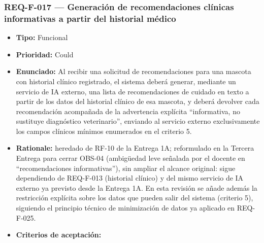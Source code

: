 \documentclass[
  spanish,
]{article}
\providecommand{\tightlist}{%
  \setlength{\itemsep}{0pt}\setlength{\parskip}{0pt}}
\begin{document}
\subsubsection{REQ-F-017 --- Generación de recomendaciones clínicas
informativas a partir del historial
médico}\label{req-f-017-generaciuxf3n-de-recomendaciones-cluxednicas-informativas-a-partir-del-historial-muxe9dico}

\begin{itemize}
\tightlist
\item
  \textbf{Tipo:} Funcional
\item
  \textbf{Prioridad:} Could
\item
  \textbf{Enunciado:} Al recibir una solicitud de recomendaciones para
  una mascota con historial clínico registrado, el sistema deberá
  generar, mediante un servicio de IA externo, una lista de
  recomendaciones de cuidado en texto a partir de los datos del
  historial clínico de esa mascota, y deberá devolver cada recomendación
  acompañada de la advertencia explícita ``informativa, no sustituye
  diagnóstico veterinario'', enviando al servicio externo exclusivamente
  los campos clínicos mínimos enumerados en el criterio 5.
\item
  \textbf{Rationale:} heredado de RF-10 de la Entrega 1A; reformulado en
  la Tercera Entrega para cerrar OBS-04 (ambigüedad leve señalada por el
  docente en ``recomendaciones informativas''), sin ampliar el alcance
  original: sigue dependiendo de REQ-F-013 (historial clínico) y del
  mismo servicio de IA externo ya previsto desde la Entrega 1A. En esta
  revisión se añade además la restricción explícita sobre los datos que
  pueden salir del sistema (criterio 5), siguiendo el principio técnico
  de minimización de datos ya aplicado en REQ-F-025.
\item
  \textbf{Criterios de aceptación:}


\end{itemize}
\end{document}
